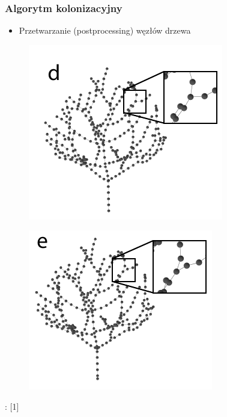 \documentclass[blue,table]{beamer}
\begin{document}
\begin{frame}\frametitle{Algorytm kolonizacyjny}
\begin{itemize}
\item{Przetwarzanie (postprocessing) węzłów drzewa}
\end{itemize}\begin{multicols}{2}
\begin{figure}
\includegraphics[scale=0.5]{img/colonization/colonization_4.png} 
\end{figure}
\begin{figure}
\includegraphics[scale=0.5]{img/colonization/colonization_5.png} 
\end{figure}
\end{multicols}
\begin{footnotesize}
: [1]
\end{footnotesize}
\end{frame}
\end{document}
